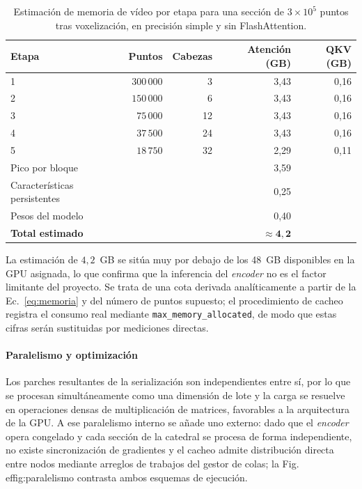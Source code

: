 \begin{table}[H]
\centering
\caption{Estimación de memoria de vídeo por etapa para una sección de
$3\times10^{5}$ puntos tras voxelización, en precisión simple y sin
FlashAttention.}
\label{tab:vram-sonata}
\begin{tabular}{@{}lrrrr@{}}
\toprule
\textbf{Etapa} & \textbf{Puntos} & \textbf{Cabezas} & \textbf{Atención (GB)} & \textbf{QKV (GB)} \\
\midrule
1 & $300\,000$ & 3 & 3{,}43 & 0{,}16 \\
2 & $150\,000$ & 6 & 3{,}43 & 0{,}16 \\
3 & $75\,000$ & 12 & 3{,}43 & 0{,}16 \\
4 & $37\,500$ & 24 & 3{,}43 & 0{,}16 \\
5 & $18\,750$ & 32 & 2{,}29 & 0{,}11 \\
\midrule
Pico por bloque & & & 3{,}59 & \\
Características persistentes & & & 0{,}25 & \\
Pesos del modelo & & & 0{,}40 & \\
\midrule
\textbf{Total estimado} & & & $\mathbf{\approx 4{,}2}$ & \\
\bottomrule
\end{tabular}
\end{table}

La estimación de $4{,}2$~GB se sitúa muy por debajo de los 48~GB disponibles en
la GPU asignada, lo que confirma que la inferencia del \emph{encoder} no es el
factor limitante del proyecto. Se trata de una cota derivada analíticamente a
partir de la Ec.~\eqref{eq:memoria} y del número de puntos supuesto; el
procedimiento de cacheo registra el consumo real mediante
\texttt{max\_memory\_allocated}, de modo que estas cifras serán sustituidas por
mediciones directas.

\paragraph*{Paralelismo y optimización}
Los parches resultantes de la serialización son independientes entre sí, por lo
que se procesan simultáneamente como una dimensión de lote y la carga se resuelve
en operaciones densas de multiplicación de matrices, favorables a la arquitectura
de la GPU. A ese paralelismo interno se añade uno externo: dado que el
\emph{encoder} opera congelado y cada sección de la catedral se procesa de forma
independiente, no existe sincronización de gradientes y el cacheo admite
distribución directa entre nodos mediante arreglos de trabajos del gestor de
colas; la Fig.~
ef{fig:paralelismo} contrasta ambos esquemas de
ejecución.

